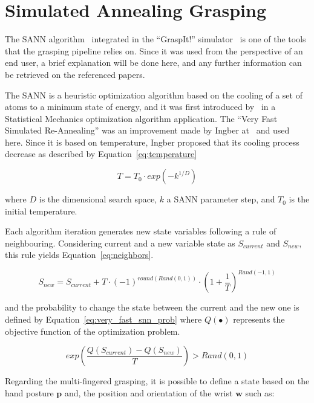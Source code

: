 \section{Simulated Annealing Grasping}
\label{sec:sim_ann}

The \ac{SANN} algorithm~\cite{Ciocarlie2009} integrated in the ``GraspIt!'' simulator~\cite{AndrewT2004} is one of the tools that the grasping pipeline relies on. Since it was used from the perspective of an end user, a brief explanation will be done here, and any further information can be retrieved on the referenced papers.

The \ac{SANN} is a heuristic optimization algorithm based on the cooling of a set of atoms to a minimum state of energy, and it was first introduced by~\cite{kirkpatrick1983} in a Statistical Mechanics optimization algorithm application. The ``Very Fast Simulated Re-Annealing'' was an improvement made by Ingber at~\cite{ingber1988} and used here. Since it is based on temperature, Ingber proposed that its cooling process decrease as described by Equation~\ref{eq:temperature}

\begin{equation}
T=T_{0} \cdot exp{(-k^{1/D})}
\label{eq:temperature}
\end{equation}

\noindent
where $D$ is the dimensional search space, $k$ a \ac{SANN} parameter step, and $T_0$ is the initial temperature.

Each algorithm iteration generates new state variables following a rule of neighbouring. Considering current and a new variable state as $S_{current}$ and $S_{new}$, this rule yields Equation~\ref{eq:neighbors}.

\begin{equation}
S_{new}=S_{current}+T \cdot(-1)^{round(Rand(0,1))} \cdot\left(1+\frac{1}{T}\right)^{Rand(-1,1)}
\label{eq:neighbors}
\end{equation}

\noindent
and the probability to change the state between the current and the new one is defined by Equation~\ref{eq:very_fast_snn_prob} where $Q(\bullet)$ represents the objective function of the optimization problem.

\begin{equation}
exp({\frac{Q(S_{current})-Q(S_{new})}{T}})>Rand(0,1)
\label{eq:very_fast_snn_prob}
\end{equation}

Regarding the multi-fingered grasping, it is possible to define a state based on the hand posture $\mathbf{p}$ and, the position and orientation of the wrist $\mathbf{w}$ such as:

